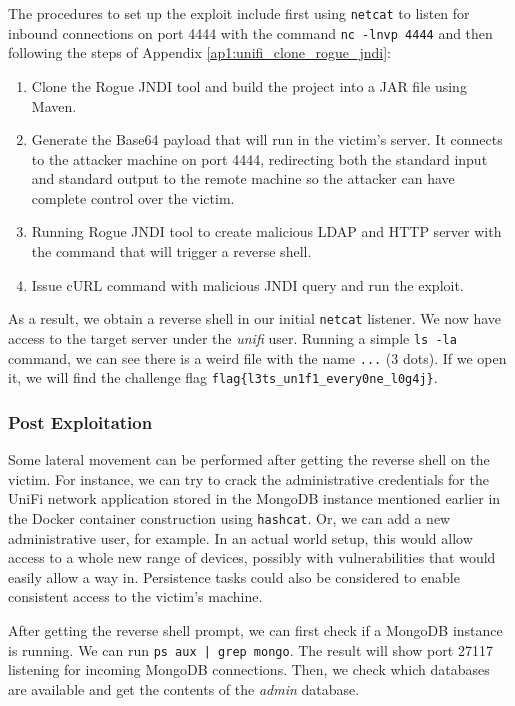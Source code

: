 The procedures to set up the exploit include first using \texttt{netcat} to listen for inbound connections on port 4444 with the command \texttt{nc -lnvp 4444} and then following the steps of Appendix \ref{ap1:unifi_clone_rogue_jndi}:

\begin{enumerate}
    \item Clone the Rogue JNDI tool and build the project into a JAR file using Maven.
    \item Generate the Base64 payload that will run in the victim's server. It connects to the attacker machine on port 4444, redirecting both the standard input and standard output to the remote machine so the attacker can have complete control over the victim.
    \item Running Rogue JNDI tool to create malicious LDAP and HTTP server with the command that will trigger a reverse shell.
    \item Issue cURL command with malicious JNDI query and run the exploit.
\end{enumerate}

As a result, we obtain a reverse shell in our initial \texttt{netcat} listener. We now have access to the target server under the \textit{unifi} user. Running a simple \texttt{ls -la} command, we can see there is a weird file with the name \texttt{...} (3 dots). If we open it, we will find the challenge flag \texttt{flag\{l3ts\_un1f1\_every0ne\_l0g4j\}}.

\subsubsection{Post Exploitation} \label{sec:validation_log4j_post_exploitation}

Some lateral movement can be performed after getting the reverse shell on the victim. For instance, we can try to crack the administrative credentials for the UniFi network application stored in the MongoDB instance mentioned earlier in the Docker container construction using \texttt{hashcat}. Or, we can add a new administrative user, for example. In an actual world setup, this would allow access to a whole new range of devices, possibly with vulnerabilities that would easily allow a way in. Persistence tasks could also be considered to enable consistent access to the victim's machine.

After getting the reverse shell prompt, we can first check if a MongoDB instance is running. We can run \texttt{ps aux | grep mongo}. The result will show port 27117 listening for incoming MongoDB connections. Then, we check which databases are available and get the contents of the \textit{admin} database.

